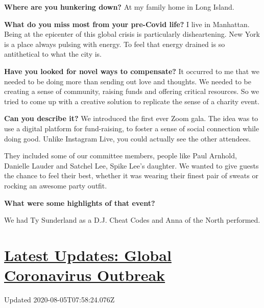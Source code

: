 \textbf{Where are you hunkering down?} At my family home in Long Island.

\textbf{What do you miss most from your pre-Covid life?} I live in
Manhattan. Being at the epicenter of this global crisis is particularly
disheartening. New York is a place always pulsing with energy. To feel
that energy drained is so antithetical to what the city is.

\textbf{Have you looked for novel ways to compensate?} It occurred to me
that we needed to be doing more than sending out love and thoughts. We
needed to be creating a sense of community, raising funds and offering
critical resources. So we tried to come up with a creative solution to
replicate the sense of a charity event.

\textbf{Can you describe it?} We introduced the first ever Zoom gala.
The idea was to use a digital platform for fund-raising, to foster a
sense of social connection while doing good. Unlike Instagram Live, you
could actually see the other attendees.

They included some of our committee members, people like Paul Arnhold,
Danielle Lauder and Satchel Lee, Spike Lee's daughter. We wanted to give
guests the chance to feel their best, whether it was wearing their
finest pair of sweats or rocking an awesome party outfit.

\textbf{What were some highlights of that event?}

We had Ty Sunderland as a D.J. Cheat Codes and Anna of the North
performed.

\hypertarget{latest-updates-global-coronavirus-outbreak}{%
\section{\texorpdfstring{\href{https://www.nytimes3xbfgragh.onion/2020/08/04/world/coronavirus-cases.html?action=click\&pgtype=Article\&state=default\&region=MAIN_CONTENT_1\&context=storylines_live_updates}{Latest
Updates: Global Coronavirus
Outbreak}}{Latest Updates: Global Coronavirus Outbreak}}\label{latest-updates-global-coronavirus-outbreak}}

Updated 2020-08-05T07:58:24.076Z


